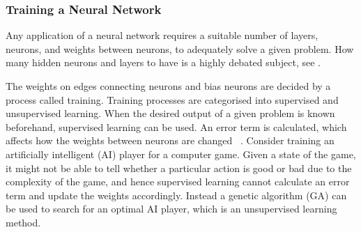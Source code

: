 \subsubsection{Training a Neural Network}
Any application of a neural network requires a suitable number of layers, neurons, and weights between neurons, to adequately solve a given problem. How many hidden neurons and layers to have is a highly debated subject, see \cite{sarle1997}.

The weights on edges connecting neurons and bias neurons are decided by a process called training. Training processes are categorised into supervised and unsupervised learning. When the desired output of a given problem is known beforehand, supervised learning can be used. An error term is calculated, which affects how the weights between neurons are changed ~\cite{backpropagation}. Consider training an artificially intelligent (AI) player for a computer game. Given a state of the game, it might not be able to tell whether a particular action is good or bad due to the complexity of the game, and hence supervised learning cannot calculate an error term and update the weights accordingly. Instead a genetic algorithm (GA) can be used to search for an optimal AI player, which is an unsupervised learning method.



